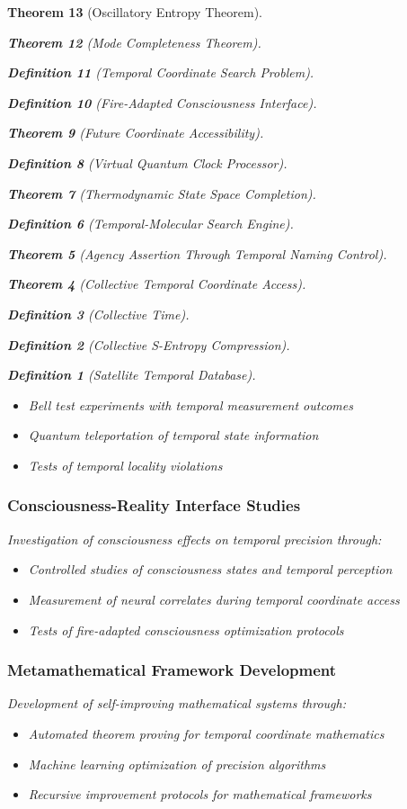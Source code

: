 \documentclass[12pt,a4paper]{article}
\newtheorem{theorem}{Theorem}[section]
\newtheorem{definition}[theorem]{Definition}
\begin{document}
\begin{theorem}[Oscillatory Entropy Theorem]
\begin{theorem}[Mode Completeness Theorem]
\begin{enumerate}
\begin{definition}[Temporal Coordinate Search Problem]
\begin{algorithm}
\begin{definition}[Fire-Adapted Consciousness Interface]
\begin{theorem}[Future Coordinate Accessibility]
\begin{definition}[Virtual Quantum Clock Processor]
\begin{itemize}
\begin{itemize}
\begin{theorem}[Thermodynamic State Space Completion]
\begin{definition}[Temporal-Molecular Search Engine]
\begin{theorem}[Agency Assertion Through Temporal Naming Control]
\begin{remark}
\begin{theorem}[Collective Temporal Coordinate Access]
\begin{definition}[Collective Time]
\begin{definition}[Collective S-Entropy Compression]
\begin{definition}[Satellite Temporal Database]
\begin{algorithm}
\begin{table}[h]
{{\begin{itemize}
\item Bell test experiments with temporal measurement outcomes
\item Quantum teleportation of temporal state information
\item Tests of temporal locality violations
\end{itemize}

\subsubsection{Consciousness-Reality Interface Studies}

Investigation of consciousness effects on temporal precision through:

\begin{itemize}
\item Controlled studies of consciousness states and temporal perception
\item Measurement of neural correlates during temporal coordinate access
\item Tests of fire-adapted consciousness optimization protocols
\end{itemize}

\subsubsection{Metamathematical Framework Development}

Development of self-improving mathematical systems through:

\begin{itemize}
\item Automated theorem proving for temporal coordinate mathematics
\item Machine learning optimization of precision algorithms
\item Recursive improvement protocols for mathematical frameworks
\end{itemize}

}}
\end{table}
\end{algorithm}
\end{definition}
\end{definition}
\end{definition}
\end{theorem}
\end{remark}
\end{theorem}
\end{definition}
\end{theorem}
\end{itemize}
\end{itemize}
\end{definition}
\end{theorem}
\end{definition}
\end{algorithm}
\end{definition}
\end{enumerate}
\end{theorem}
\end{theorem}
\end{document}
